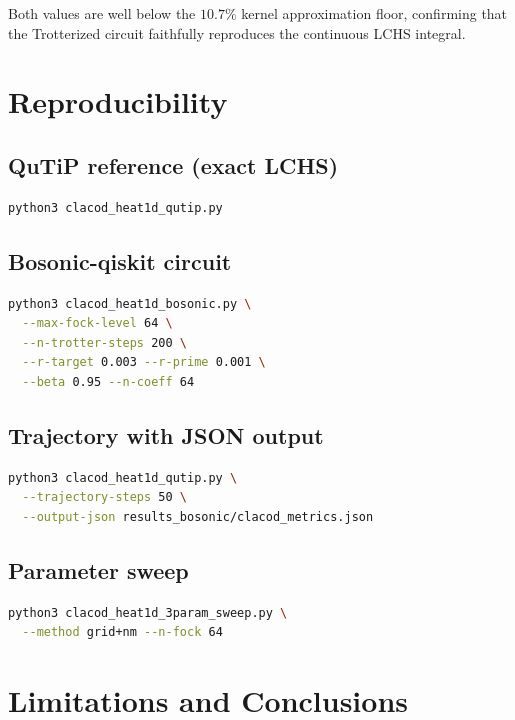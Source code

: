 \documentclass[11pt]{article}
\begin{document}
Both values are well below the $10.7\%$ kernel approximation floor, confirming
that the Trotterized circuit faithfully reproduces the continuous LCHS integral.

\section{Reproducibility}

\subsection{QuTiP reference (exact LCHS)}
\begin{lstlisting}[language=bash]
python3 clacod_heat1d_qutip.py
\end{lstlisting}

\subsection{Bosonic-qiskit circuit}
\begin{lstlisting}[language=bash]
python3 clacod_heat1d_bosonic.py \
  --max-fock-level 64 \
  --n-trotter-steps 200 \
  --r-target 0.003 --r-prime 0.001 \
  --beta 0.95 --n-coeff 64
\end{lstlisting}

\subsection{Trajectory with JSON output}
\begin{lstlisting}[language=bash]
python3 clacod_heat1d_qutip.py \
  --trajectory-steps 50 \
  --output-json results_bosonic/clacod_metrics.json
\end{lstlisting}

\subsection{Parameter sweep}
\begin{lstlisting}[language=bash]
python3 clacod_heat1d_3param_sweep.py \
  --method grid+nm --n-fock 64
\end{lstlisting}

\section{Limitations and Conclusions}
\end{document}
